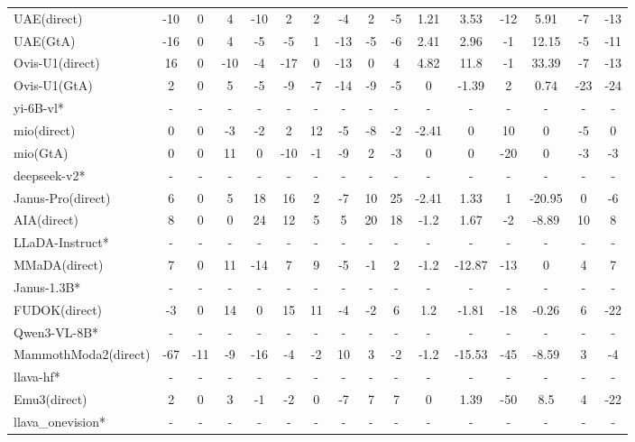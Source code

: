\documentclass{article}
\theoremstyle{plain}
\theoremstyle{definition}
\theoremstyle{remark}
\begin{document}
\begin{table}[!htbp]
{\begin{tabular}{@{}lccccccccccccccc@{}}
UAE(direct) & -10 & 0 & 4 & -10 & 2 & 2 & -4 & 2 & -5 & 1.21 & 3.53 & -12 & 5.91 & -7 & -13 \\
UAE(GtA) & -16 & 0 & 4 & -5 & -5 & 1 & -13 & -5 & -6 & 2.41 & 2.96 & -1 & 12.15 & -5 & -11 \\
Ovis-U1(direct) & 16 & 0 & -10 & -4 & -17 & 0 & -13 & 0 & 4 & 4.82 & 11.8 & -1 & 33.39 & -7 & -13 \\
Ovis-U1(GtA) & 2 & 0 & 5 & -5 & -9 & -7 & -14 & -9 & -5 & 0 & -1.39 & 2 & 0.74 & -23 & -24 \\
\midrule
\rowcolor{gray!12}
yi-6B-vl* & - & - & - & - & - & - & - & - & - & - & - & - & - & - & - \\
mio(direct) & 0 & 0 & -3 & -2 & 2 & 12 & -5 & -8 & -2 & -2.41 & 0 & 10 & 0 & -5 & 0 \\
mio(GtA) & 0 & 0 & 11 & 0 & -10 & -1 & -9 & 2 & -3 & 0 & 0 & -20 & 0 & -3 & -3 \\
\midrule
\rowcolor{gray!12}
deepseek-v2* & - & - & - & - & - & - & - & - & - & - & - & - & - & - & - \\
Janus-Pro(direct) & 6 & 0 & 5 & 18 & 16 & 2 & -7 & 10 & 25 & -2.41 & 1.33 & 1 & -20.95 & 0 & -6 \\
AIA(direct) & 8 & 0 & 0 & 24 & 12 & 5 & 5 & 20 & 18 & -1.2 & 1.67 & -2 & -8.89 & 10 & 8 \\
\midrule
\rowcolor{gray!12}
LLaDA-Instruct* & - & - & - & - & - & - & - & - & - & - & - & - & - & - & - \\
MMaDA(direct) & 7 & 0 & 11 & -14 & 7 & 9 & -5 & -1 & 2 & -1.2 & -12.87 & -13 & 0 & 4 & 7 \\
\midrule
\rowcolor{gray!12}
Janus-1.3B* & - & - & - & - & - & - & - & - & - & - & - & - & - & - & - \\
FUDOK(direct) & -3 & 0 & 14 & 0 & 15 & 11 & -4 & -2 & 6 & 1.2 & -1.81 & -18 & -0.26 & 6 & -22 \\
\midrule
\rowcolor{gray!12}
Qwen3-VL-8B* & - & - & - & - & - & - & - & - & - & - & - & - & - & - & - \\
MammothModa2(direct) & -67 & -11 & -9 & -16 & -4 & -2 & 10 & 3 & -2 & -1.2 & -15.53 & -45 & -8.59 & 3 & -4 \\
\midrule
\rowcolor{gray!12}
llava-hf* & - & - & - & - & - & - & - & - & - & - & - & - & - & - & - \\
Emu3(direct) & 2 & 0 & 3 & -1 & -2 & 0 & -7 & 7 & 7 & 0 & 1.39 & -50 & 8.5 & 4 & -22 \\
\midrule
\rowcolor{gray!12}
llava\_onevision* & - & - & - & - & - & - & - & - & - & - & - & - & - & - & - \\

\end{tabular}}
\end{table}
\end{document}
